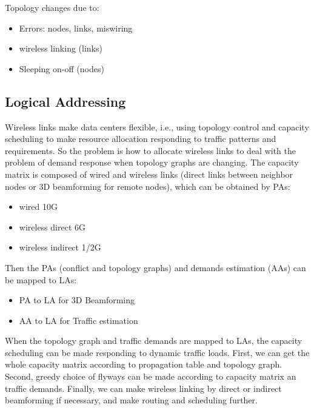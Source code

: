 \documentclass[journal,onecolumn,11pt]{IEEEtran}
\begin{document}
Topology changes due to:
\begin{itemize}
  \item Errors: nodes, links, miswiring
  \item wireless linking (links)
  \item Sleeping on-off (nodes)
\end{itemize}

\subsection{Logical Addressing}

Wireless links make data centers flexible, i.e., using topology control and capacity scheduling to make resource allocation responding to traffic patterns and requirements. So the problem is how to allocate wireless links to deal with the problem of demand response when topology graphs are changing. The capacity matrix is composed of wired and wireless links (direct links between neighbor nodes or 3D beamforming for remote nodes), which can be obtained by PAs:
\begin{itemize}
  \item wired 10G
  \item wireless direct 6G
  \item wireless indirect 1/2G
\end{itemize}

Then the PAs (conflict and topology graphs) and demands estimation (AAs) can be mapped to LAs:
\begin{itemize}
  \item PA to LA for 3D Beamforming
  \item AA to LA for Traffic estimation
\end{itemize}

When the topology graph and traffic demands are mapped to LAs, the capacity scheduling can be made responding to dynamic traffic loads. First, we can get the whole capacity matrix according to propagation table and topology graph. Second, greedy choice of flyways can be made according to capacity matrix an traffic demands. Finally, we can make wireless linking by direct or indirect beamforming if necessary, and make routing and scheduling further.

\renewcommand\refname{References}
%


\end{document}

